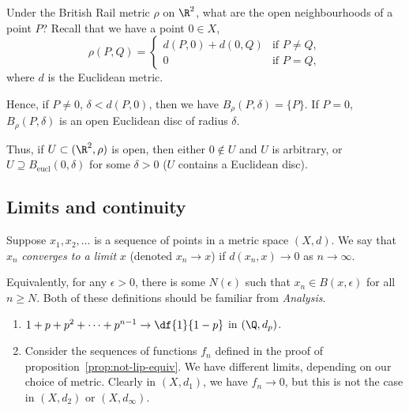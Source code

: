\begin{example}
	Under the British Rail metric $\rho$ on $\R^2$, what are the open neighbourhoods of a point $P$? Recall that we have a point $0\in X$, %
	\begin{equation*}
		\rho(P,Q) =
		\begin{cases}
			d(P,0) + d(0,Q) & \text{if } P\neq Q, \\ %
			0 & \text{if } P=Q,
		\end{cases}
	\end{equation*}
	where $d$ is the Euclidean metric.
	
	Hence, if $P\neq 0$, $\delta<d(P,0)$, then we have $B_\rho(P,\delta) = \{P\}$. If $P=0$, $B_\rho(P,\delta)$ is an open Euclidean disc of radius $\delta$. %
	
	Thus, if $U\subset(\R^2,\rho)$ is open, then either $0\not\in U$ and $U$ is arbitrary, or $U \supseteq B_\text{eucl}(0,\delta)$ for some $\delta>0$ ($U$ contains a Euclidean disc). %
\end{example}


	\pagebreak

\subsection{Limits and continuity} %
\label{sub:limits_and_continuity}

\begin{definition}
	Suppose $x_1,x_2,\ldots$ is a sequence of points in a metric space $(X,d)$. We say that $x_n$ \emph{converges to a limit} $x$ (denoted $x_n \to x$) if $d(x_n,x) \to 0$ as $n\to\infty$.
	
	Equivalently, for any $\epsilon>0$, there is some $N(\epsilon)$ such that $x_n \in B(x,\epsilon)$ for all $n\geq N$. Both of these definitions should be familiar from \emph{Analysis}. %
\end{definition}

\begin{examples}
\begin{enumerate}
	\item $1+p+p^2+\cdots+p^{n-1} \to \df{1}{1-p}$ in $(\Q,d_p)$.
	\item Consider the sequences of functions $f_n$ defined in the proof of proposition~\ref{prop:not-lip-equiv}. We have different limits, depending on our choice of metric. Clearly in $(X,d_1)$, we have $f_n \to 0$, but this is not the case in $(X,d_2)$ or $(X,d_\infty)$.
\end{enumerate}
\end{examples}

